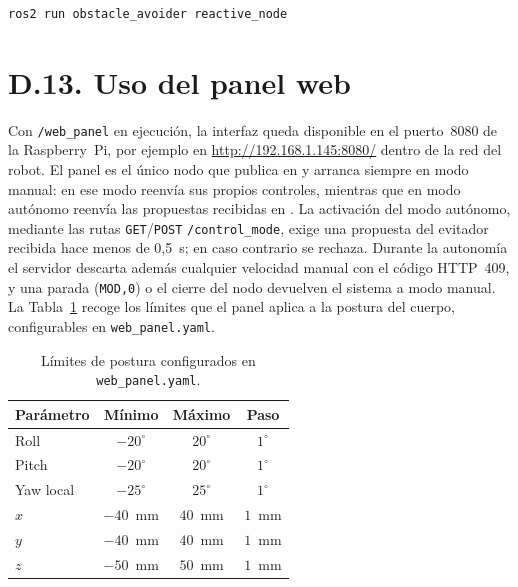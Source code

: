 \begin{lstlisting}[basicstyle=\ttfamily\small,frame=single]
ros2 run obstacle_avoider reactive_node
\end{lstlisting}

\section*{D.13. Uso del panel web}

Con \texttt{/web\_panel} en ejecución, la interfaz queda disponible en el
puerto~8080 de la Raspberry~Pi, por ejemplo en
\url{http://192.168.1.145:8080/} dentro de la red del robot. El panel es el
único nodo que publica en  y arranca siempre en modo
manual: en ese modo reenvía sus propios controles, mientras que en modo
autónomo reenvía las propuestas recibidas en . La
activación del modo autónomo, mediante las rutas \texttt{GET}/\texttt{POST}
\texttt{/control\_mode}, exige una propuesta del evitador recibida hace menos
de 0,5~s; en caso contrario se rechaza. Durante la autonomía el servidor
descarta además cualquier velocidad manual con el código HTTP~409, y una
parada (\texttt{MOD,0}) o el cierre del nodo devuelven el sistema a modo
manual. La Tabla~\ref{tab:manual_limites_postura} recoge los límites que el
panel aplica a la postura del cuerpo, configurables en
\texttt{web\_panel.yaml}.

\begin{table}[H]
    \centering
    \small
    \begin{tabularx}{\textwidth}{@{}l c c c@{}}
        \toprule
        \textbf{Parámetro} & \textbf{Mínimo} & \textbf{Máximo} & \textbf{Paso} \\
        \midrule
        Roll & $-20^\circ$ & $20^\circ$ & $1^\circ$ \\
        Pitch & $-20^\circ$ & $20^\circ$ & $1^\circ$ \\
        Yaw local & $-25^\circ$ & $25^\circ$ & $1^\circ$ \\
        $x$ & $-40$~mm & $40$~mm & $1$~mm \\
        $y$ & $-40$~mm & $40$~mm & $1$~mm \\
        $z$ & $-50$~mm & $50$~mm & $1$~mm \\
        \bottomrule
    \end{tabularx}
    \caption{Límites de postura configurados en \texttt{web\_panel.yaml}.}
    \label{tab:manual_limites_postura}
\end{table}

